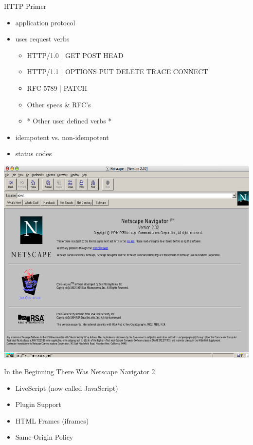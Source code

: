 \documentclass[11pt]{beamer}
\begin{document}
\begin{frame}{HTTP Primer}
  \begin{itemize}
  \item application protocol\pause
  \item uses request verbs\pause
    \begin{itemize}
    \item HTTP/1.0 | GET POST HEAD\pause
    \item HTTP/1.1 | OPTIONS PUT DELETE TRACE CONNECT\pause
    \item RFC 5789 | PATCH\pause
    \item Other specs \& RFC's\pause
    \item * Other user defined verbs *\pause
    \end{itemize}
  \item idempotent vs. non-idempotent\pause
  \item status codes
  \end{itemize}
\end{frame}

\begin{frame}
  \includegraphics[keepaspectratio=true,width=\framewidth]{netscapenavigator2.png}
\end{frame}

\begin{frame}{In the Beginning There Was Netscape Navigator 2}
  \begin{itemize}
  \item LiveScript (now called JavaScript)\pause
  \item Plugin Support\pause
  \item HTML Frames (iframes)\pause
  \item Same-Origin Policy
  \end{itemize}
\end{frame}
\end{document}
